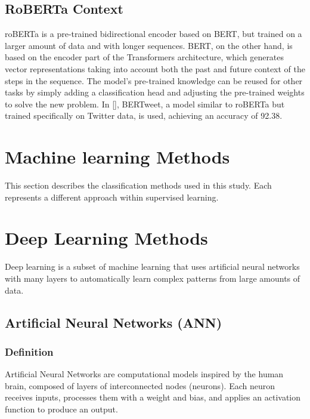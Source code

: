 \subsection{RoBERTa Context}

roBERTa is a pre-trained bidirectional encoder based on BERT, but trained on a larger amount of data and with longer sequences. BERT, on the other hand, is based on the encoder part of the Transformers architecture, which generates vector representations taking into account both the past and future context of the steps in the sequence. The model's pre-trained knowledge can be reused for other tasks by simply adding a classification head and adjusting the pre-trained weights to solve the new problem. In [], BERTweet, a model similar to roBERTa but trained specifically on Twitter data, is used, achieving an accuracy of 92.38.

\section{Machine learning Methods}
This section describes the classification methods used in this study. Each represents a different approach within supervised learning.















\section{Deep Learning Methods}
Deep learning is a subset of machine learning that uses artificial neural networks with many layers to automatically learn complex patterns from large amounts of data.

\subsection{Artificial Neural Networks (ANN)}
\subsubsection{Definition}
Artificial Neural Networks are computational models inspired by the human brain, composed of layers of interconnected nodes (neurons). Each neuron receives inputs, processes them with a weight and bias, and applies an activation function to produce an output.


